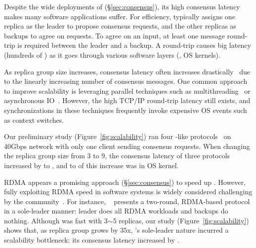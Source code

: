 Despite the wide deployments of \paxos (\S\ref{sec:consensus}), its high 
consensus latency makes many software applications suffer. For efficiency, 
\paxos typically assigns one replica as the leader to propose consensus 
requests, and the other replicas as backups to agree on requests. To 
agree on an input, at least one message round-trip is required between the 
leader and a backup. A round-trip causes big latency (hundreds of \us) as it 
goes through various software layers (\eg, OS kernels).


As replica group size increases, \paxos consensus latency often increases
drastically~\cite{scatter:sosp11} due to the linearly increasing number of 
consensus messages. One common approach to improve \paxos scalability is 
leveraging parallel techniques such as multithreading~\cite{zookeeper, 
spaxos:srds12} or asynchronous IO~\cite{crane:sosp15, libpaxos}. However, the 
high TCP/IP round-trip latency still exists, and synchronizations in these 
techniques frequently invoke expensive OS events such as context switches.

Our preliminary study (Figure~\ref{fig:scalability}) ran four \paxos-like 
protocols~\cite{zookeeper, spaxos:srds12, crane:sosp15, libpaxos} on 40Gbps 
network with only one client sending consensus requests. When changing the 
replica group size from 3 to 9, the consensus latency of three protocols 
increased by \tradlatencyincreaselow to \tradlatencyincreasehigh, and 
\systemcostlow to \systemcosthigh of this increase was in OS kernel.

RDMA appears a promising approach (\S\ref{sec:consensus}) to speed up \paxos. 
However, fully exploiting RDMA speed in software systems is widely considered 
challenging by the community~\cite{pilaf:usenix14,herd:sigcomm14,
farm:sosp15,dare:hpdc15}. For instance, \dare~\cite{dare:hpdc15} presents a
two-round, RDMA-based \paxos protocol in a sole-leader manner: leader does all 
RDMA workloads and backups do nothing. Although \dare was fast with 3$\sim$5 
replicas, our study (Figure~\ref{fig:scalability}) shows that, as replica 
group grows by 35x, \dare's sole-leader nature incurred a scalability 
bottleneck: its consensus latency increased by \darescalability.

